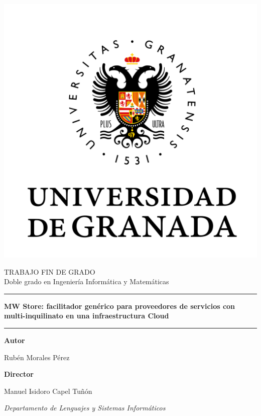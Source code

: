 \documentclass[11pt,english]{article} %
\title{  } %
\author{ }
\date{ } %
\begin{document}
\begin{center}
  \includegraphics[scale=0.4]{img/logo_ugr.png}
\end{center}

\begin{center}
  \Large TRABAJO FIN DE GRADO\\ 
  \large Doble grado en Ingeniería Informática y Matemáticas
  \vspace{0.7cm}

  \hrule
  \vspace{0.2cm}
  \textbf{\LARGE MW Store: facilitador genérico para proveedores de servicios con multi-inquilinato en una infraestructura Cloud}
  \vspace{0.2cm}
  \hrule
  \vspace{2cm}
  
  \textbf{Autor}

  Rubén Morales Pérez

  \vspace{2cm}
  \textbf{Director}

  Manuel Isidoro Capel Tuñón

  \textit{Departamento de Lenguajes y Sistemas Informáticos}
\end{center}

\newpage

\ 
\thispagestyle{empty}
\end{document}
